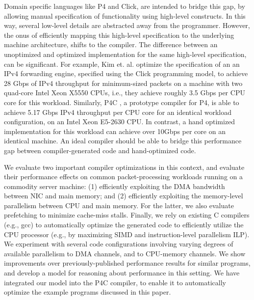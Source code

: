 Domain specific languages like P4\cite{Bosshart:2014:PPP:2656877.2656890} and Click\cite{kohler2000click}, are intended
to bridge this gap, by allowing manual specification of functionality using high-level constructs. In this way, several
low-level details are abstracted away from the programmer. However, the onus of efficiently mapping this high-level
specification to the underlying machine architecture, shifts to the compiler. The difference between an unoptimized
and optimized implementation for the same high-level specification, can be significant.
For example, Kim et. al. \cite{Kim:2012:PBC:2349896.2349910} optimize the specification of an
an IPv4 forwarding engine, specified using the Click programming model, to achieve 28 Gbps of IPv4 throughput for minimum-sized
packets
on a machine with two quad-core Intel Xeon X5550 CPUs, i.e., they achieve roughly 3.5 Gbps per CPU core for this workload.
Similarly, P4C \cite{p4c}, a prototype compiler for P4,
is able to achieve 5.17 Gbps IPv4 throughput per CPU core for an identical workload configuration, on an Intel Xeon E5-2630
CPU. In contrast, a hand optimized implementation for this workload can achieve over 10Gbps per core on an
identical machine. An ideal compiler should be able to
bridge this performance gap between compiler-generated code and hand-optimized code.

We evaluate two important compiler optimizations in this context, and evaluate their performance
effects on common packet-processing workloads running on a commodity server machine: (1) efficiently exploiting
the DMA bandwidth between NIC and main memory; and (2) efficiently exploiting the memory-level
parallelism between CPU and main memory. For the latter, we also evaluate prefetching to minimize
cache-miss stalls. Finally, we rely on existing C compilers (e.g., gcc) to automatically optimize
the generated code to efficiently utilize the CPU processor (e.g., by maximizing SIMD
and instruction-level parallelism ILP). We experiment with several code configurations involving varying
degrees of available parallelism to DMA channels, and to CPU-memory channels. We show
improvements over previously-published performance results for similar programs, and develop a model
for reasoning about performance in this setting. We have integrated our model into the
P4C compiler, to enable it to
automatically optimize the example programs discussed in this paper.


